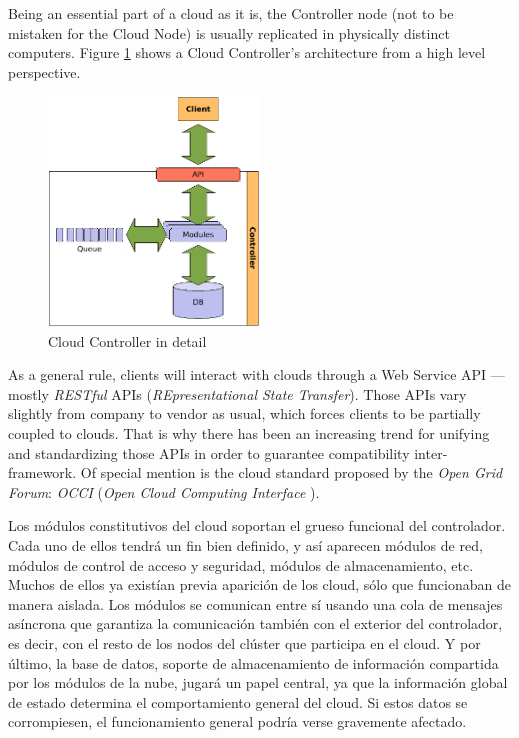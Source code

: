 Being an essential part of a cloud as it is, the Controller node (not to be mistaken for the Cloud Node) is usually replicated in physically distinct computers. Figure \ref{fig:cloudcontroller} shows a Cloud Controller's architecture from a high level perspective.

\begin{figure}[tbp]
\begin{center}
\includegraphics[width=0.5\textwidth]{imagenes/005.pdf}
 \caption{Cloud Controller in detail}
\label{fig:cloudcontroller}
\end{center}
\end{figure}

As a general rule, clients will interact with clouds through a Web Service API --- mostly \emph{RESTful} APIs (\emph{REpresentational State Transfer}). Those APIs vary slightly from company to vendor as usual, which forces clients to be partially coupled to clouds. That is why there has been an increasing trend for unifying and standardizing those APIs in order to guarantee compatibility inter-framework. Of special mention is the cloud standard proposed by the \emph{Open Grid Forum}: \emph{OCCI} (\emph{Open Cloud Computing Interface} \cite{occisdraft}).


Los m\'odulos constitutivos del cloud soportan el grueso funcional del controlador. Cada uno de ellos tendr\'a un fin bien definido, y as\'i aparecen m\'odulos de red, m\'odulos de control de acceso y seguridad, m\'odulos de almacenamiento, etc. Muchos de ellos ya exist\'ian previa aparici\'on de los cloud, s\'olo que funcionaban de manera aislada. Los m\'odulos se comunican entre s\'i usando una cola de mensajes as\'incrona que garantiza la comunicaci\'on tambi\'en con el exterior del controlador, es decir, con el resto de los nodos del cl\'uster que participa en el cloud. Y por \'ultimo, la base de datos, soporte de almacenamiento de informaci\'on compartida por los m\'odulos de la nube, jugar\'a un papel central, ya que la informaci\'on global de estado determina el comportamiento general del cloud. Si estos datos se corrompiesen, el funcionamiento general podr\'ia verse gravemente afectado.\newline

